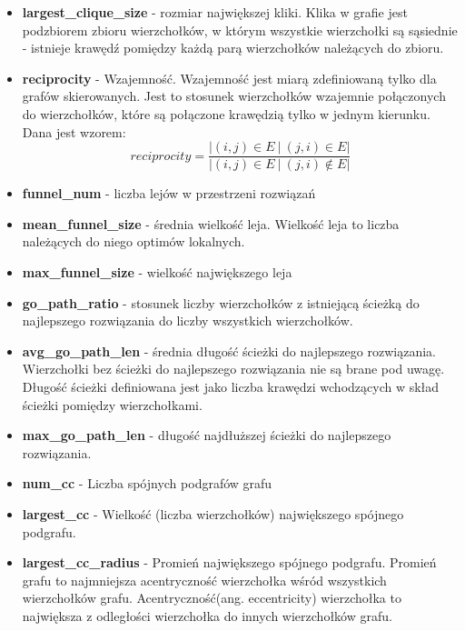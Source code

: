 \begin{itemize}
      \item \textbf{largest\_clique\_size} - rozmiar największej kliki. Klika w grafie jest podzbiorem zbioru wierzchołków, w którym wszystkie wierzchołki są sąsiednie - istnieje krawędź pomiędzy każdą parą wierzchołków należących do zbioru.
      \item \textbf{reciprocity} - Wzajemność. Wzajemność jest miarą zdefiniowaną tylko dla grafów skierowanych. Jest to stosunek wierzchołków wzajemnie połączonych do wierzchołków, które są połączone krawędzią tylko w jednym kierunku.
            Dana jest wzorem:
            \begin{equation}
                  \label{eq:reciprocity}
                  reciprocity = \frac{ |(i, j) \in E  \: | \: (j, i) \in E| }{|(i, j) \in E  \: | \: (j, i) \notin E| }
            \end{equation}
      \item \textbf{funnel\_num} - liczba lejów w przestrzeni rozwiązań
      \item \textbf{mean\_funnel\_size} - średnia wielkość leja. Wielkość leja to liczba należących do niego optimów lokalnych.
      \item \textbf{max\_funnel\_size} - wielkość największego leja
      \item \textbf{go\_path\_ratio} - stosunek liczby wierzchołków z istniejącą ścieżką do najlepszego rozwiązania do liczby wszystkich wierzchołków.
      \item \textbf{avg\_go\_path\_len} - średnia długość ścieżki do najlepszego rozwiązania. Wierzchołki bez ścieżki do najlepszego rozwiązania nie są brane pod uwagę.
            Długość ścieżki definiowana jest jako liczba krawędzi wchodzących w skład ścieżki pomiędzy wierzchołkami.
      \item \textbf{max\_go\_path\_len} - długość najdłuższej ścieżki do najlepszego rozwiązania.
      \item \textbf{num\_cc} - Liczba spójnych podgrafów grafu
      \item \textbf{largest\_cc} - Wielkość (liczba wierzchołków) największego spójnego podgrafu.
      \item \textbf{largest\_cc\_radius} - Promień największego spójnego podgrafu. Promień grafu to najmniejsza acentryczność wierzchołka wśród wszystkich wierzchołków grafu.
            Acentryczność(ang. eccentricity) wierzchołka to największa z odległości wierzchołka do innych wierzchołków grafu.
\end{itemize}

